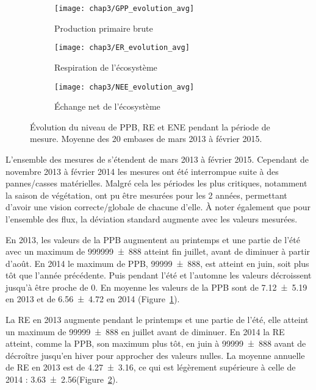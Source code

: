 \begin{figure}
	\centering
	\begin{subfigure}[t]{\textwidth}
		\centering
		\texttt{[image: chap3/GPP\_evolution\_avg]}
		\caption{Production primaire brute}
		\label{fig:GPP_evolution_avg}
	\end{subfigure}%
	
	\begin{subfigure}[t]{\textwidth}
		\centering
		\texttt{[image: chap3/ER\_evolution\_avg]}
		\caption{Respiration de l'écosystème}
		\label{fig:ER_evolution_avg}
	\end{subfigure}
	
	\begin{subfigure}[t]{\textwidth}
		\centering
		\texttt{[image: chap3/NEE\_evolution\_avg]}
		\caption{Échange net de l'écosystème}
		\label{fig:NEE_evolution_avg}
	\end{subfigure}
\caption{Évolution du niveau de PPB, RE et ENE pendant la période de mesure. Moyenne des 20 embases de mars 2013 à février 2015.}
\label{fig:flux_evolution_avg}
\end{figure}

L'ensemble des mesures de \coo s'étendent de mars 2013 à février 2015.
Cependant de novembre 2013 à février 2014 les mesures ont été interrompue suite à des pannes/casses matérielles.
Malgré cela les périodes les plus critiques, notamment la saison de végétation, ont pu être mesurées pour les 2 années, permettant d'avoir une vision correcte/globale de chacune d'elle.
À noter également que pour l'ensemble des flux, la déviation standard augmente avec les valeurs mesurées.

En 2013, les valeurs de la PPB augmentent au printemps et une partie de l'été avec un maximum de \SI{999999(888)}{\uml} atteint fin juillet, avant de diminuer à partir d'août.
En 2014 le maximum de PPB, \SI{99999(888)}{\uml}, est atteint en juin, soit plus tôt que l'année précédente.
Puis pendant l'été et l'automne les valeurs décroissent jusqu'à être proche de 0.
En moyenne les valeurs de la PPB sont de \SI{7.12(519)}{\uml} en 2013 et de \SI{6.56(472)}{\uml} en 2014 (Figure~\ref{fig:GPP_evolution_avg}).

La RE en 2013 augmente pendant le printemps et une partie de l'été, elle atteint un maximum de \SI{99999(888)}{\uml} en juillet avant de diminuer.
En 2014 la RE atteint, comme la PPB, son maximum plus tôt, en juin à \SI{99999(888)}{\uml} avant de décroître jusqu'en hiver pour approcher des valeurs nulles.
La moyenne annuelle de RE en 2013 est de \SI{4.27(316)}{\uml}, ce qui est légèrement supérieure à celle de 2014 : \SI{3.63(256)}{\uml}(Figure~\ref{fig:ER_evolution_avg}).

